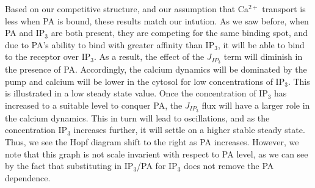 \documentclass[preprint,12pt]{elsarticle}
\begin{document}


Based on our competitive structure, and our assumption that Ca$^{2+}$ transport is less when PA is bound, these results match our intution. As we saw before, when PA and IP$_3$ are both present, they are competing for the same binding spot, and due to PA's ability to bind with greater affinity than IP$_3$, it will be able to bind to the receptor over IP$_3$. As a result, the effect of the $J_{IP_3}$ term will diminish in the presence of PA. Accordingly, the calcium dynamics will be dominated by the pump and calcium will be lower in the cytosol for low concentrations of IP$_3$. This is illustrated in a low steady state value. Once the concentration of IP$_3$ has increased to a suitable level to conquer PA, the $J_{IP_3}$ flux will have a larger role in the calcium dynamics. This in turn will lead to oscillations, and as the concentration IP$_3$ increases further, it will settle on a higher stable steady state. Thus, we see the Hopf diagram shift to the right as PA increases. However, we note that this graph is not scale invarient with respect to PA level, as we can see by the fact that substituting in IP$_3$/PA for IP$_3$ does not remove the PA dependence. 
\end{document}
